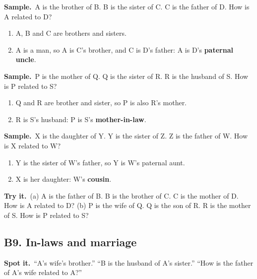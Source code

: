 \documentclass[11pt,a4paper]{article}
\let\oldsubsection\subsection
\renewcommand{\subsection}{\needspace{9\baselineskip}\oldsubsection}
\newcommand{\spot}{\textbf{\color{ember}Spot it.}\ }
\newif\ifkeepsamp
\newcommand{\samp}{\ifkeepsamp\needspace{4\baselineskip}\fi\textbf{\color{ember}Sample.}\ }
\newcommand{\tryit}[1]{\textbf{\color{ember}Try it.}\ #1}
\begin{document}
\samp A is the brother of B. B is the sister of C. C is the father of D. How is A related to D?
\begin{enumerate}
\item A, B and C are brothers and sisters.
\item A is a man, so A is C's brother, and C is D's father: A is D's \textbf{paternal uncle}.
\end{enumerate}
\samp P is the mother of Q. Q is the sister of R. R is the husband of S. How is P related to S?
\begin{enumerate}
\item Q and R are brother and sister, so P is also R's mother.
\item R is S's husband: P is S's \textbf{mother-in-law}.
\end{enumerate}
\samp X is the daughter of Y. Y is the sister of Z. Z is the father of W. How is X related to W?
\begin{enumerate}
\item Y is the sister of W's father, so Y is W's paternal aunt.
\item X is her daughter: W's \textbf{cousin}.
\end{enumerate}

\tryit (a) A is the father of B. B is the brother of C. C is the mother of D. How is A related to D? (b) P is the wife of Q. Q is the son of R. R is the mother of S. How is P related to S?

\subsection{B9. In-laws and marriage}
\spot ``A's wife's brother.'' ``B is the husband of A's sister.'' ``How is the father of A's wife related to A?''
\end{document}
